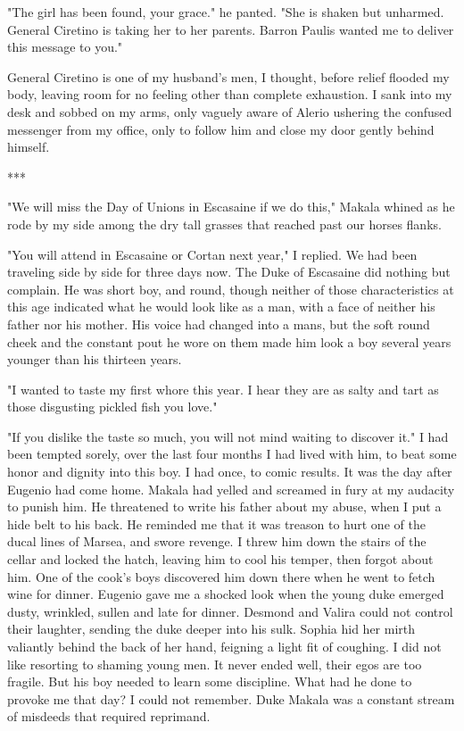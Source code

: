 \documentclass{article}
\begin{document}
"The girl has been found, your grace." he panted. "She is shaken but unharmed. General Ciretino is taking her to her parents. Barron Paulis wanted me to deliver this message to you."

General Ciretino is one of my husband's men, I thought, before relief flooded my body, leaving room for no feeling other than complete exhaustion. I sank into my desk and sobbed on my arms, only vaguely aware of Alerio ushering the confused messenger from my office, only to follow him and close my door gently behind himself.

\vspace{.5cm}
***

"We will miss the Day of Unions in Escasaine if we do this," Makala whined as he rode by my side among the dry tall grasses that reached past our horses flanks.

"You will attend in Escasaine or Cortan next year," I replied. We had been traveling side by side for three days now. The Duke of Escasaine did nothing but complain. He was short boy, and round, though neither of those characteristics at this age indicated what he would look like as a man, with a face of neither his father nor his mother. His voice had changed into a mans, but the soft round cheek and the constant pout he wore on them made him look a boy several years younger than his thirteen years.

"I wanted to taste my first whore this year. I hear they are as salty and tart as those disgusting pickled fish you love."

"If you dislike the taste so much, you will not mind waiting to discover it." I had been tempted sorely, over the last four months I had lived with him, to beat some honor and dignity into this boy. I had once, to comic results. It was the day after Eugenio had come home. Makala had yelled and screamed in fury at my audacity to punish him. He threatened to write his father about my abuse, when I put a hide belt to his back. He reminded me that it was treason to hurt one of the ducal lines of Marsea, and swore revenge. I threw him down the stairs of the cellar and locked the hatch, leaving him to cool his temper, then forgot about him. One of the cook's boys discovered him down there when he went to fetch wine for dinner. Eugenio gave me a shocked look when the young duke emerged dusty, wrinkled, sullen and late for dinner. Desmond and Valira could not control their laughter, sending the duke deeper into his sulk. Sophia hid her mirth valiantly behind the back of her hand, feigning a light fit of coughing. I did not like resorting to shaming young men. It never ended well, their egos are too fragile. But his boy needed to learn some discipline. What had he done to provoke me that day? I could not remember. Duke Makala was a constant stream of misdeeds that required reprimand. 
\end{document}
